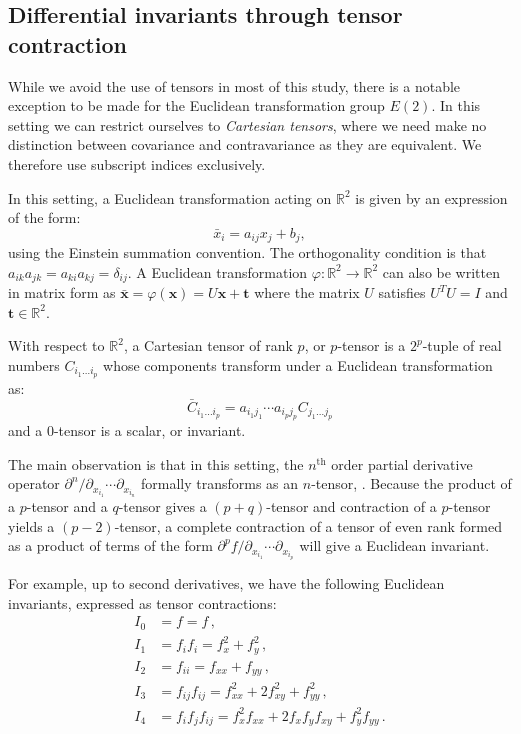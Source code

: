 \documentclass[review,onefignum,onetabnum]{siamonline190516}
\begin{document}
\subsection{Differential invariants through tensor contraction}
\label{sec:contraction}

While we avoid the use of tensors in most of this study, there is a notable
exception to be made for the Euclidean transformation group $E(2)$. In this
setting we can restrict ourselves to \emph{Cartesian tensors}, where we
need make no distinction between covariance and contravariance as they are
equivalent. We therefore use subscript indices exclusively.

In this setting, a Euclidean transformation acting on $\mathbb{R}^2$ is given
by an expression of the form:
\begin{equation*}
  \bar{x}_i = a_{ij}x_j + b_j,
\end{equation*}
using the Einstein summation convention. The orthogonality condition is
that $a_{ik}a_{jk} = a_{ki}a_{kj} = \delta_{ij}$. A Euclidean
transformation $\varphi \colon \mathbb{R}^2 \to \mathbb{R}^2$ can also be
written in matrix form as $\bar{\mathbf{x}} = \varphi(\mathbf{x}) =
U\mathbf{x} + \mathbf{t}$ where the matrix $U$ satisfies $U^TU = I$ and
$\mathbf{t} \in \mathbb{R}^2$.

With respect to $\mathbb{R}^2$, a Cartesian tensor of rank $p$, or $p$-tensor is a $2^p$-tuple of real numbers $C_{i_1\ldots i_p}$ whose components transform under a Euclidean transformation as:
\begin{equation*}
  \bar{C}_{i_1\ldots i_p} = a_{i_1j_1}\cdots a_{i_pj_p} C_{j_1\ldots j_p}
\end{equation*}
and a $0$-tensor is a scalar, or invariant. 

The main observation is that in this setting, the $n^\text{th}$ order
partial derivative operator $\partial^n / \partial_{x_{i_1}}\cdots
\partial_{x_{i_n}}$ formally transforms as an $n$-tensor, \citep{Florack1993}. Because the product of a $p$-tensor and a $q$-tensor gives a $(p+q)$-tensor and contraction of a $p$-tensor yields a $(p-2)$-tensor, a complete contraction of a tensor of even rank formed as a product of terms of the form $\partial^p f / \partial_{x_{i_1}} \cdots \partial_{x_{i_p}}$ will give a Euclidean invariant.

For example, up to second derivatives, we have the following Euclidean invariants, expressed as tensor contractions:
\begin{equation}
\label{eq:e2tensor}
\begin{aligned}
  I_0 &= f = f \,,\\
  I_1 &= f_if_i = f_x^2 + f_y^2  \,,\\
  I_2 &= f_{ii} = f_{xx} + f_{yy} \,,\\
  I_3 &= f_{ij} f_{ij} = f_{xx}^2 + 2f_{xy}^2 + f_{yy}^2 \,,\\
  I_4 &= f_i f_j f_{ij} = f_x^2 f_{xx} + 2f_x f_y f_{xy} + f_y^2 f_{yy}\,.
\end{aligned}
\end{equation}
\end{document}
